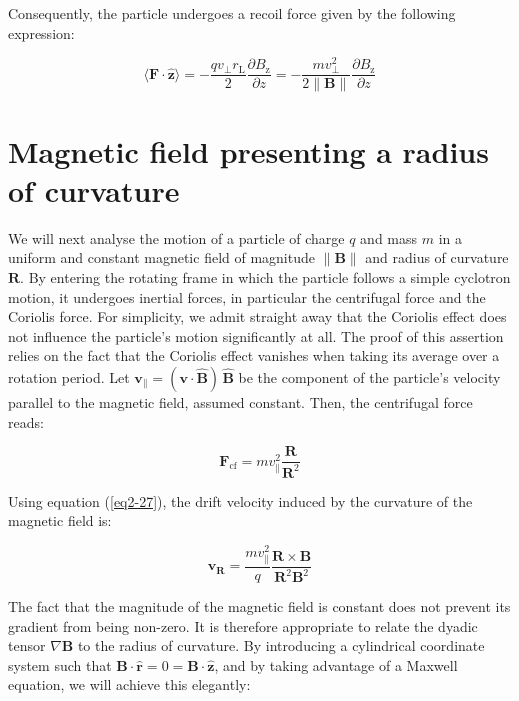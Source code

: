 Consequently, the particle undergoes a recoil force given by the following expression:

\begin{equation}
    \label{eq2-42}
    \langle\mathbf{F}\cdot\mathbf{\hat{z}}\rangle=-\frac{qv_\perp r_\text{L}}{2}\frac{\partial B_\text{z}}{\partial z}=-\frac{mv_\perp^2}{2\|\mathbf{B}\|}\frac{\partial B_\text{z}}{\partial z}
\end{equation}

\section{Magnetic field presenting a radius of curvature}

\label{sec2-6}

We will next analyse the motion of a particle of charge $q$ and mass $m$ in a uniform and constant magnetic field of magnitude $\|\mathbf{B}\|$ and radius of curvature $\mathbf{R}$. By entering the rotating frame in which the particle follows a simple cyclotron motion, it undergoes inertial forces, in particular the centrifugal force and the Coriolis force. For simplicity, we admit straight away that the Coriolis effect does not influence the particle's motion significantly at all. The proof of this assertion relies on the fact that the Coriolis effect vanishes when taking its average over a rotation period. Let $\mathbf{v}_\parallel=(\mathbf{v}\cdot\mathbf{\hat{B}})\,\mathbf{\hat{B}}$ be the component of the particle's velocity parallel to the magnetic field, assumed constant.
Then, the centrifugal force reads:

\begin{equation}
    \mathbf{F}_\text{cf}=mv_\parallel^2\frac{\mathbf{R}}{\mathbf{R}^2}
\end{equation}

Using equation (\ref{eq2-27}), the drift velocity induced by the curvature of the magnetic field is:

\begin{equation}
    \mathbf{v}_\mathbf{R}=\frac{mv_\parallel^2}{q}\frac{\mathbf{R}\times\mathbf{B}}{\mathbf{R}^2\mathbf{B}^2}
\end{equation}

The fact that the magnitude of the magnetic field is constant does not prevent its gradient from being non-zero. It is therefore appropriate to relate the dyadic tensor $\nabla\mathbf{B}$ to the radius of curvature. By introducing a cylindrical coordinate system such that $\mathbf{B}\cdot\mathbf{\hat{r}}=0=\mathbf{B}\cdot\mathbf{\hat{z}}$, and by taking advantage of a Maxwell equation, we will achieve this elegantly:

